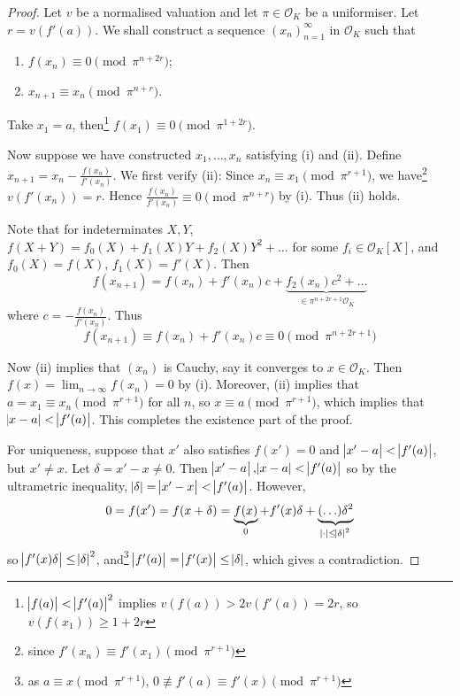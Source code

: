 \documentclass[11pt]{article}
\theoremstyle{definition}
\theoremstyle{plain}
\theoremstyle{remark}
\newcommand{\cO}{\mathcal{O}}
\begin{document}
\begin{proof}
    Let $v$ be a normalised valuation and let $\pi \in \cO_K$ be a uniformiser. Let $r = v(f'(a))$. We shall construct a sequence $(x_n)_{n=1}^\infty$ in $\cO_K$ such that
    \begin{enumerate}
        \item $f(x_n) \equiv 0 \pmod{\pi^{n + 2r}}$;
        \item $x_{n+1} \equiv x_n \pmod{\pi^{n+r}}$.
    \end{enumerate}
    Take $x_1 = a$, then\footnote{$\abs{f(a)} < \abs{f'(a)}^2$ implies $v(f(a)) > 2v(f'(a)) = 2r$, so $v(f(x_1)) \ge 1 + 2r$} $f(x_1) \equiv 0 \pmod{\pi^{1+2r}}$.

    Now suppose we have constructed $x_1, \ldots, x_n$ satisfying (i) and (ii). Define $x_{n+1} = x_n - \frac{f(x_n)}{f'(x_n)}$. We first verify (ii): Since $x_n \equiv x_1 \pmod{\pi^{r+1}}$, we have\footnote{since $f'(x_n) \equiv f'(x_1) \pmod{\pi^{r+1}}$} $v(f'(x_n)) = r$. Hence $\frac{f(x_n)}{f'(x_n)} \equiv 0 \pmod{\pi^{n+r}}$ by (i). Thus (ii) holds.

    Note that for indeterminates $X, Y$, $f(X + Y) = f_0(X) + f_1(X) Y + f_2(X) Y^2 + \ldots$ for some $f_i \in \cO_K[X]$, and $f_0(X) = f(X)$, $f_1(X) = f'(X)$. Then
    \begin{equation*}
        f(x_{n+1}) = f(x_n) + f'(x_n) c + \underbrace{f_2(x_n) c^2 + \ldots}_{\in \pi^{n + 2r + 1} \cO_K}
    \end{equation*}
    where $c = -\frac{f(x_n)}{f'(x_n)}$. Thus
    \begin{equation*}
        f(x_{n+1}) \equiv f(x_n) + f'(x_n) c \equiv 0 \pmod{\pi^{n + 2r + 1}}
    \end{equation*}

    Now (ii) implies that $(x_n)$ is Cauchy, say it converges to $x \in \cO_K$. Then $f(x) = \lim_{n \to \infty} f(x_n) = 0$ by (i). Moreover, (ii) implies that $a = x_1 \equiv x_n \pmod{\pi^{r+1}}$ for all $n$, so $x \equiv a \pmod{\pi^{r+1}}$, which implies that $\abs{x - a} < \abs{f'(a)}$. This completes the existence part of the proof.

    For uniqueness, suppose that $x'$ also satisfies $f(x') = 0$ and $\abs{x' - a} < \abs{f'(a)}$, but $x' \neq x$. Let $\delta = x' - x \neq 0$. Then $\abs{x' - a}, \abs{x - a} < \abs{f'(a)}$ so by the ultrametric inequality, $\abs{\delta} = \abs{x' - x} < \abs{f'(a)}$. However,
    \begin{equation*}
        0 = f(x') = f(x + \delta) = \underbrace{f(x)}_{0} + f'(x) \delta + \underbrace{(\ldots)\delta^2}_{\abs{\cdot} \le \abs{\delta}^2}
    \end{equation*}
    so $\abs{f'(x) \delta} \le \abs{\delta}^2$, and\footnote{as $a \equiv x \pmod{\pi^{r+1}}$, $0 \not\equiv f'(a) \equiv f'(x) \pmod{\pi^{r+1}}$} $\abs{f'(a)} = \abs{f'(x)} \le \abs{\delta}$, which gives a contradiction.
\end{proof}
\end{document}
